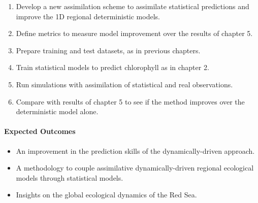 \begin{enumerate}

\item Develop a new assimilation scheme to assimilate statistical predictions
and improve the 1D regional deterministic models.

\item Define metrics to measure model improvement over the results of
chapter 5.

\item Prepare training and test datasets, as in previous chapters.

\item Train statistical models to predict chlorophyll as in chapter 2.

\item Run simulations with assimilation of statistical and real observations.

\item Compare with results of chapter 5 to see if the method improves
over the deterministic model alone.

\end{enumerate}

\paragraph{Expected Outcomes}

\begin{itemize}

\item An improvement in the prediction skills of the dynamically-driven
approach.

\item A methodology to couple assimilative dynamically-driven regional
ecological models through statistical models.

\item Insights on the global ecological dynamics of the Red Sea.

\end{itemize}
